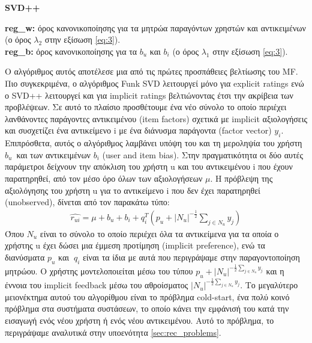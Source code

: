 \noindent \textbf{SVD++}
\begin{tcolorbox}[
	colframe=blue!25,
	colback=blue!10,
	coltitle=blue!20!black,  
	fonttitle=\bfseries,
	adjusted title= Υπερπαράμετροι]	
	
	\textbf{reg\_w:} όρος κανονικοποίησης για τα μητρώα παραγόντων χρηστών και αντικειμένων (ο όρος $ \lambda_2 $ στην εξίσωση \eqref{eq:3}).\\ 
	\textbf{reg\_b:} όρος κανονικοποίησης για τα $  b_u $ και $  b_i $ (ο όρος $ \lambda_1 $ στην εξίσωση \eqref{eq:3}).
\end{tcolorbox}
\noindent Ο αλγόριθμος αυτός \cite{korenFactorizationMeetsNeighborhood2008} αποτέλεσε μια από τις πρώτες προσπάθειες βελτίωσης του MF. Πιο συγκεκριμένα, ο αλγόριθμος Funk SVD λειτουργεί μόνο για explicit ratings ενώ ο SVD++ λειτουργεί και για implicit ratings βελτιώνοντας έτσι την ακρίβεια των προβλέψεων. Σε αυτό το πλαίσιο προσθέτουμε ένα νέο σύνολο το οποίο περιέχει λανθάνοντες παράγοντες αντικειμένου (item factors) σχετικά με implicit αξιολογήσεις και συσχετίζει ένα αντικείμενο i με ένα διάνυσμα παράγοντα (factor vector) $  y_i $. Επιπρόσθετα, αυτός ο αλγόριθμος λαμβάνει υπόψη του και τη μεροληψία του χρήστη $  b_u $\ και των αντικειμένων $  b_i $ (user and item bias). Στην πραγματικότητα οι δύο αυτές παράμετροι δείχνουν την απόκλιση του χρήστη u και του αντικειμένου i που έχουν παρατηρηθεί, από τον μέσο όρο όλων των αξιολογήσεων $ \mu $. Η πρόβλεψη της αξιολόγησης του χρήστη u για το αντικείμενο i που δεν έχει παρατηρηθεί (unobserved), δίνεται από τον παρακάτω τύπο:
\begin{align}
		\widehat{r_{ui}}=\mu+b_u+b_i+q_i^T\left(p_u+\left|N_u\right|^{-\frac{1}{2}}{\sum_{j\in N_u} y_j}\right) \label{eq:1}
\end{align}
Όπου $ N_{u} $ είναι το σύνολο το οποίο περιέχει όλα τα αντικείμενα για τα οποία ο χρήστης u έχει δώσει μια έμμεση προτίμηση (implicit preference), ενώ τα διανύσματα $ p_u $ και $ \ q_i $ είναι τα ίδια με αυτά που περιγράψαμε στην παραγοντοποίηση μητρώου. Ο χρήστης μοντελοποιείται μέσω του τύπου $ p_u+\left|N_u\right|^{-\frac{1}{2}\sum_{j\in N_u} y_j}$ και η έννοια του implicit feedback μέσω του αθροίσματος $ \left|N_u\right|^{-\frac{1}{2}\sum_{j\in N_u} y_j}$. Το μεγαλύτερο μειονέκτημα αυτού του αλγορίθμου είναι το πρόβλημα cold-start, ένα πολύ κοινό πρόβλημα στα συστήματα συστάσεων, το οποίο κάνει την εμφάνισή του κατά την εισαγωγή ενός νέου χρήστη ή ενός νέου αντικειμένου. Αυτό το πρόβλημα, το περιγράψαμε αναλυτικά στην υποενότητα \ref{sec:rec_problems}.\\
